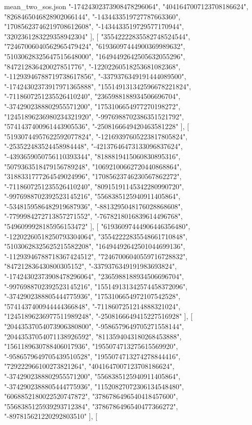 \begin{filecontents*}[overwrite]{mean_two_sos.json}
    "-17424302373908478296064",
    "4041647007123708186624",
    "8268465046828902066144",
    "-1434433519727787663360",
    "17085623746219708612608",
    "-1434433519729577170944",
    "3202361283229358942304"
   ],
   [
    "35542222835582748524544",
    "72467006040562965479424",
    "61936097444900369989632",
    "51030628325647515648000",
    "16494492642505632055296",
    "847212836420027851776",
    "-12202260518253681082368",
    "-11293946788719738617856",
    "-3379376349191444089500",
    "-17424302373917971365888",
    "155149131342596678221824",
    "-7118607251235526410240",
    "2365988188934506696704",
    "-3742902388802955571200",
    "1753106654977270198272",
    "12451896236980234321920",
    "-9976988702386351521792",
    "5741437400961443905536",
    "-2508166649420463581228"
   ],
   [
    "51930744957622592077824",
    "-12169397605223817805824",
    "-253522483524458984448",
    "-42137646473133096837624",
    "-4393659050756110393344",
    "8188819415060830895316",
    "5079363518479156789248",
    "10692100662720440868864",
    "3188331777264549024996",
    "17085623746230567862272",
    "-7118607251235526410240",
    "80915191145342280990720",
    "-9976988702392523145216",
    "5568385125940911405864",
    "-5348159586482919687936",
    "-8813295048176028868608",
    "-7799984272713857271552",
    "-7678218016839614496768",
    "5496099928185956153472"
   ],
   [
    "61936097444906446356480",
    "-12202260518250793304064",
    "35542222835548661710848",
    "51030628325625215582208",
    "16494492642501044699136",
    "-11293946788718367424512",
    "72467006040559716728832",
    "847212836430800305152",
    "-3379376349191983693824",
    "-17424302373908478296064",
    "2365988188934506696704",
    "-9976988702392523145216",
    "155149131342574458372096",
    "-3742902388805444775936",
    "1753106654972107542528",
    "5741437400944444366848",
    "-7118607251214888321024",
    "12451896236977511989248",
    "-2508166649415227516928"
   ],
   [
    "20443537054073906380800",
    "-9586579649705271558144",
    "20443537054071138926592",
    "8113594043180268453888",
    "1561189630788406017936",
    "1955074713275615569920",
    "-9586579649705439510528",
    "1955074713274278844416",
    "729222966100273821264",
    "4041647007123708186624",
    "-3742902388802955571200",
    "5568385125940911405864",
    "-3742902388805444775936",
    "11520827072306134548480",
    "6068852180022520747872",
    "3786786496540418457600",
    "5568385125939293712384",
    "3786786496540477366272",
    "-897815621220292803510"
   ],
   [

\end{filecontents*}
